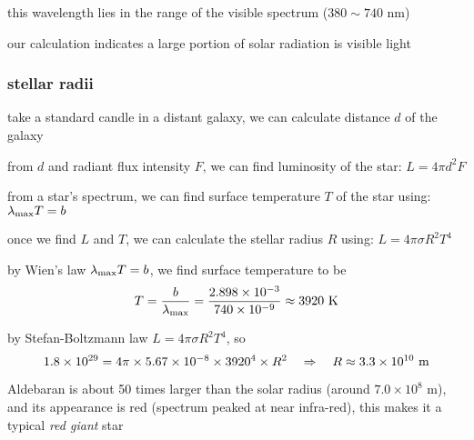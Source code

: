 this wavelength lies in the range of the visible spectrum ($380 \sim 740 \text{ nm}$)

our calculation indicates a large portion of solar radiation is visible light \eoe


\subsubsection{stellar radii}

take a standard candle in a distant galaxy, we can calculate distance $d$ of the galaxy

from $d$ and radiant flux intensity $F$, we can find luminosity of the star: $L = 4\pi d^2 F$

from a star's spectrum, we can find surface temperature $T$ of the star using: $\lambda_{\text{max}} T = b$

once we find $L$ and $T$, we can calculate the stellar radius $R$ using: $L = 4\pi \sigma R^2 T^4$


\sol by Wien's law $\lambda_{\text{max}} T = b$, we find surface temperature to be
\begin{equation*}
	T = \frac{b}{\lambda_{\text{max}}} = \frac{2.898\times10^{-3}}{740\times10^{-9}} \approx 3920 \text{ K}
\end{equation*}

\vspace*{0.1em}

by Stefan-Boltzmann law $L = 4\pi \sigma R^2 T^4 $, so
\begin{equation*}
	1.8\times10^{29} = 4\pi \times 5.67\times10^{-8} \times 3920^4 \times R^2 \quad \Rightarrow \quad R\approx 3.3\times10^{10} \text{ m}
\end{equation*}

Aldebaran is about 50 times larger than the solar radius (around $7.0 \times10^8 \text{ m}$), and its appearance is red (spectrum peaked at near infra-red), this makes it a typical \emph{red giant} star \eoe

